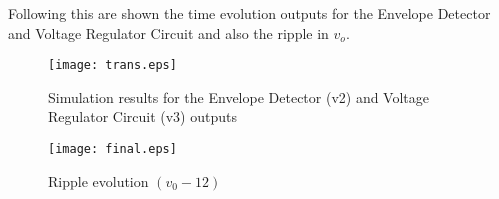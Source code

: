 Following this are shown the time evolution outputs for the Envelope Detector and Voltage Regulator Circuit and also the ripple in $v_o$. 

\begin{figure}[H]
        \centering
        \texttt{[image: trans.eps]}
        \caption{Simulation results for the Envelope Detector (v2) and Voltage Regulator Circuit (v3) outputs}
        \label{sim_res}
\end{figure}

\begin{figure}[H]
        \centering
        \texttt{[image: final.eps]}
        \caption{Ripple evolution $(v_0-12)$}
        \label{sim_ripple_res}
\end{figure}
